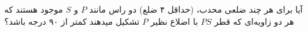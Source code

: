 آیا برای هر چند ضلعی محدب، (حداقل ۴ ضلع) دو راس مانند $P$ و $S$ موجود هستند که هر دو زاویه‌ای که 
قطر $PS$ با اضلاع نظیر $P$ تشکیل میدهند کمتر از ۹۰ درجه باشد؟